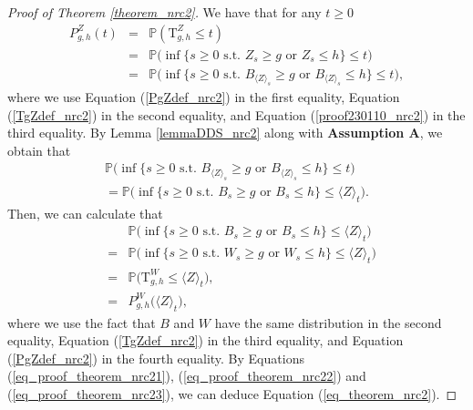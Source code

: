 \documentclass[aop]{imsart}
\theoremstyle{plain}
\theoremstyle{remark}
\newcommand{\proba}{\mathbb{P}}
\newcommand{\Tau}{\mathrm{T}}
\begin{document}
\begin{proof}[Proof of Theorem \ref{theorem_nrc2}] We have that for any $t \geq 0$
\begin{eqnarray}
\nonumber P_{g,h}^Z(t) & = & \proba (\Tau^Z_{g,h} \leq t)\\ \nonumber 
& = & \proba \big(\inf \{s \geq 0 \text{ s.t. } Z_s \geq g \text{ or } Z_s \leq h\} \leq t \big)\\ \label{eq_proof_theorem_nrc21} 
& = & \proba \big(\inf \{s \geq 0\text{ s.t. } B_{\langle Z\rangle_{s}} \geq g \text{ or } B_{\langle Z\rangle_{s}} \leq h\} \leq t\big),
\end{eqnarray}
where we use Equation (\ref{PgZdef_nrc2}) in the first equality, Equation (\ref{TgZdef_nrc2}) in the second equality, and Equation (\ref{proof230110_nrc2}) in the third equality. By Lemma \ref{lemmaDDS_nrc2} along with \textbf{Assumption A}, we obtain that
\begin{eqnarray}
\label{eq_proof_theorem_nrc22}\proba \Big(\inf \{s \geq 0 \text{ s.t. } B_{\langle Z\rangle_s}\geq g \text{ or } B_{\langle Z\rangle_{s}} \leq h\} \leq t \Big) \\ \nonumber =\proba \Big(\inf \{s \geq 0 \text{ s.t. } B_s \geq g \text{ or } B_s \leq h \} \leq \langle Z\rangle_t \Big).
\end{eqnarray}
Then, we can calculate that
\begin{eqnarray}
\nonumber & & \proba \Big(\inf \{s \geq 0 \text{ s.t. } B_s \geq g \text{ or } B_s \leq h \} \leq \langle Z\rangle_t \Big)\\
\nonumber &=& \proba \Big(\inf \{s \geq 0 \text{ s.t. } W_s \geq g \text{ or } W_s \leq h\} \leq \langle Z\rangle_t \Big)\\ \nonumber & = & \proba \Big(\Tau^W_{g,h} \leq \langle Z\rangle_t\Big),\\ \label{eq_proof_theorem_nrc23}
& = & P_{g,h}^W\big(\langle Z\rangle_t\big), 
\end{eqnarray}
where we use the fact that $B$ and $W$ have the same distribution in the second equality, Equation (\ref{TgZdef_nrc2}) in the third equality, and Equation (\ref{PgZdef_nrc2}) in the fourth equality. By Equations (\ref{eq_proof_theorem_nrc21}), (\ref{eq_proof_theorem_nrc22}) and (\ref{eq_proof_theorem_nrc23}), we can deduce Equation (\ref{eq_theorem_nrc2}).
\end{proof}
\end{document}
